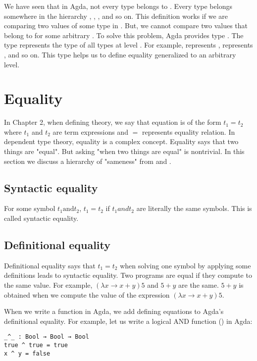 We have seen that in Agda, not every type belongs to . Every
type belongs somewhere in the hierarchy , ,
, and so on. This definition works if we are comparing two values
of some type in . But, we cannot compare two values that belong to
 for some arbitrary . To solve this problem, Agda
provides type . The type  represents the type of all
types at level . For example,  represents ,
 represents , and so on. This type helps us to define
equality generalized to an arbitrary level.

\section{Equality}
\label{equality}
In Chapter 2, when defining theory, we say that equation is of the form $t_1 =
t_2$ where $t_1$ and $t_2$ are term expressions and $=$ represents equality
relation. In dependent type theory, equality is a complex concept. Equality says
that two things are "equal". But asking "when two things are equal" is
nontrivial. In this section we discuss a hierarchy of "sameness" from
\cite{bocquet2020coherence} and \cite{eremondi2022propositional}.

\subsection{Syntactic equality}
For some symbol $t_1 \text{and} t_2$, $t_1 = t_2$ if $t_1 and t_2$ are literally
the same symbols. This is called syntactic equality.

\subsection{Definitional equality}
Definitional equality says that $t_1 = t_2$ when solving one symbol by applying
some definitions leads to syntactic equality. Two programs are equal if they
compute to the same value. For example, $(\lambda x \rightarrow x + y) 5$ and $5
+ y$ are the same. $5 + y$ is obtained when we compute the value of the
expression $ (\lambda x \rightarrow x + y) 5$.

When we write a function in Agda, we add defining equations to Agda's
definitional equality. For example, let us write a logical AND function
(\inline{_^_}) in Agda:

\begin{verbatim}
_^_ : Bool → Bool → Bool
true ^ true = true
x ^ y = false
\end{verbatim}

